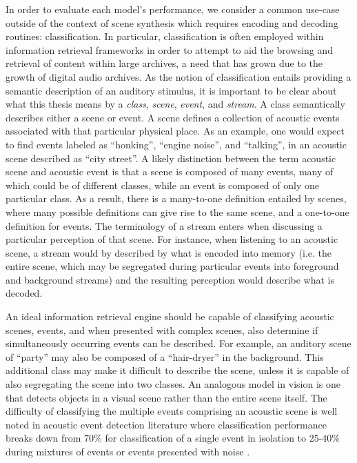 \documentclass[a4paper,10pt,final]{ThesisStyle}
\begin{document}
In order to evaluate each model's performance, we consider a common use-case outside of the context of scene synthesis which requires encoding and decoding routines: classification.  In particular, classification is often employed within information retrieval frameworks in order to attempt to aid the browsing and retrieval of content within large archives, a need that has grown due to the growth of digital audio archives.  As the notion of classification entails providing a semantic description of an auditory stimulus, it is important to be clear about what this thesis means by a \textit{class}, \textit{scene}, \textit{event}, and \textit{stream}.  A class semantically describes either a scene or event.  A scene defines a collection of acoustic events associated with that particular physical place.  As an example, one would expect to find events labeled as ``honking'', ``engine noise'', and ``talking'', in an acoustic scene described as ``city street''.  A likely distinction between the term acoustic scene and acoustic event is that a scene is composed of many events, many of which could be of different classes, while an event is composed of only one particular class.  As a result, there is a many-to-one definition entailed by scenes, where many possible definitions can give rise to the same scene, and a one-to-one definition for events.  The terminology of a stream enters when discussing a particular perception of that scene.  For instance, when listening to an acoustic scene, a stream would by described by what is encoded into memory (i.e. the entire scene, which may be segregated during particular events into foreground and background streams) and the resulting perception would describe what is decoded.  

An ideal information retrieval engine should be capable of classifying acoustic scenes, events, and when presented with complex scenes, also determine if simultaneously occurring events can be described.  For example, an auditory scene of ``party'' may also be composed of a ``hair-dryer'' in the background.  This additional class may make it difficult to describe the scene, unless it is capable of also segregating the scene into two classes.  An analogous model in vision is one that detects objects in a visual scene rather than the entire scene itself.  The difficulty of classifying the multiple events comprising an acoustic scene is well noted in acoustic event detection literature where classification performance breaks down from 70\% for classification of a single event in isolation to 25-40\% during mixtures of events or events presented with noise \cite{Temko2007}.  
\end{document}
